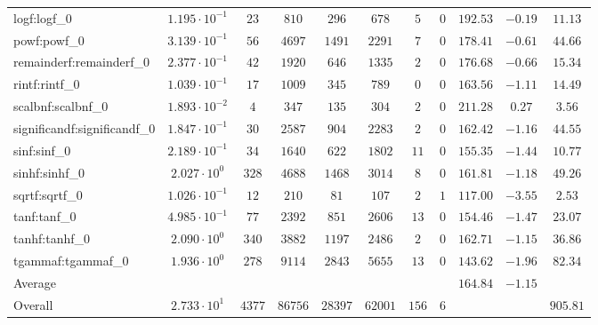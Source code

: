 \begin{tabular}{|l|c|c|c|c|c|c|c|c|c|c|}
logf:logf\_0                 & $ 1.195 \cdot 10^{-1} $ & $ 23     $ & $ 810   $ & $ 296   $ & $ 678   $ & $ 5   $ & $ 0 $ & $ 192.53      $ & $ -0.19   $ & $ 11.13   $ \\
powf:powf\_0                 & $ 3.139 \cdot 10^{-1} $ & $ 56     $ & $ 4697  $ & $ 1491  $ & $ 2291  $ & $ 7   $ & $ 0 $ & $ 178.41      $ & $ -0.61   $ & $ 44.66   $ \\
remainderf:remainderf\_0     & $ 2.377 \cdot 10^{-1} $ & $ 42     $ & $ 1920  $ & $ 646   $ & $ 1335  $ & $ 2   $ & $ 0 $ & $ 176.68      $ & $ -0.66   $ & $ 15.34   $ \\
rintf:rintf\_0               & $ 1.039 \cdot 10^{-1} $ & $ 17     $ & $ 1009  $ & $ 345   $ & $ 789   $ & $ 0   $ & $ 0 $ & $ 163.56      $ & $ -1.11   $ & $ 14.49   $ \\
scalbnf:scalbnf\_0           & $ 1.893 \cdot 10^{-2} $ & $ 4      $ & $ 347   $ & $ 135   $ & $ 304   $ & $ 2   $ & $ 0 $ & $ 211.28      $ & $ 0.27    $ & $ 3.56    $ \\
significandf:significandf\_0 & $ 1.847 \cdot 10^{-1} $ & $ 30     $ & $ 2587  $ & $ 904   $ & $ 2283  $ & $ 2   $ & $ 0 $ & $ 162.42      $ & $ -1.16   $ & $ 44.55   $ \\
sinf:sinf\_0                 & $ 2.189 \cdot 10^{-1} $ & $ 34     $ & $ 1640  $ & $ 622   $ & $ 1802  $ & $ 11  $ & $ 0 $ & $ 155.35      $ & $ -1.44   $ & $ 10.77   $ \\
sinhf:sinhf\_0               & $ 2.027 \cdot 10^{0}  $ & $ 328    $ & $ 4688  $ & $ 1468  $ & $ 3014  $ & $ 8   $ & $ 0 $ & $ 161.81      $ & $ -1.18   $ & $ 49.26   $ \\
sqrtf:sqrtf\_0               & $ 1.026 \cdot 10^{-1} $ & $ 12     $ & $ 210   $ & $ 81    $ & $ 107   $ & $ 2   $ & $ 1 $ & $ 117.00      $ & $ -3.55   $ & $ 2.53    $ \\
tanf:tanf\_0                 & $ 4.985 \cdot 10^{-1} $ & $ 77     $ & $ 2392  $ & $ 851   $ & $ 2606  $ & $ 13  $ & $ 0 $ & $ 154.46      $ & $ -1.47   $ & $ 23.07   $ \\
tanhf:tanhf\_0               & $ 2.090 \cdot 10^{0}  $ & $ 340    $ & $ 3882  $ & $ 1197  $ & $ 2486  $ & $ 2   $ & $ 0 $ & $ 162.71      $ & $ -1.15   $ & $ 36.86   $ \\
tgammaf:tgammaf\_0           & $ 1.936 \cdot 10^{0}  $ & $ 278    $ & $ 9114  $ & $ 2843  $ & $ 5655  $ & $ 13  $ & $ 0 $ & $ 143.62      $ & $ -1.96   $ & $ 82.34   $ \\
\hline
Average                      & $                     $ & $        $ & $       $ & $       $ & $       $ & $     $ & $   $ & $ 164.84      $ & $ -1.15   $ & $         $ \\
\hline
Overall                      & $ 2.733 \cdot 10^{1}  $ & $ 4377   $ & $ 86756 $ & $ 28397 $ & $ 62001 $ & $ 156 $ & $ 6 $ & $             $ & $         $ & $ 905.81  $ \\
\hline
\end{tabular}
